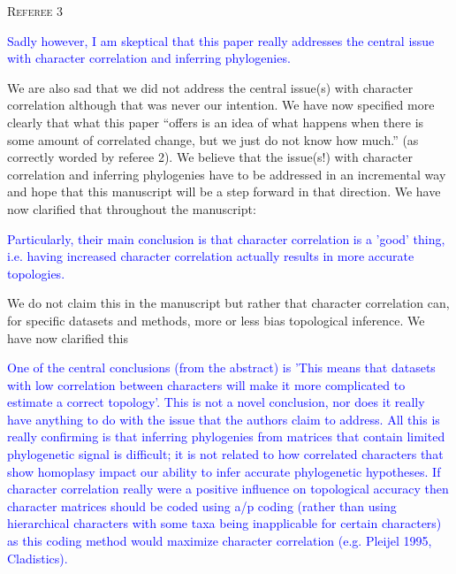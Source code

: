 \documentclass[12pt,letterpaper]{article}
\renewcommand{\section}[1]{%
\bigskip
\begin{center}
\begin{Large}
\normalfont\scshape #1
\medskip
\end{Large}
\end{center}}
\begin{document}
\section{Referee 3}

\textcolor{blue}{Sadly however, I am skeptical that this paper really addresses the central issue with character correlation and inferring phylogenies.}

We are also sad that we did not address the central issue(s) with character correlation although that was never our intention. We have now specified more clearly that what this paper ``offers is an idea of what happens when there is some amount of correlated change, but we just do not know how much.'' (as correctly worded by referee 2). We believe that the issue(s!) with character correlation and inferring phylogenies have to be addressed in an incremental way and hope that this manuscript will be a step forward in that direction. We have now clarified that throughout the manuscript: 




\textcolor{blue}{Particularly, their main conclusion is that character correlation is a 'good' thing, i.e. having increased character correlation actually results in more accurate topologies.} 

We do not claim this in the manuscript but rather that character correlation can, for specific datasets and methods, more or less bias topological inference. We have now clarified this




\textcolor{blue}{One of the central conclusions (from the abstract) is 'This means that datasets with low correlation between characters will make it more complicated to estimate a correct topology'. This is not a novel conclusion, nor does it really have anything to do with the issue that the authors claim to address. All this is really confirming is that inferring phylogenies from matrices that contain limited phylogenetic signal is difficult; it is not related to how correlated characters that show homoplasy impact our ability to infer accurate phylogenetic hypotheses. If character correlation really were a positive influence on topological accuracy then character matrices should be coded using a/p coding (rather than using hierarchical characters with some taxa being inapplicable for certain characters) as this coding method would maximize character correlation (e.g. Pleijel 1995, Cladistics).}
\end{document}
